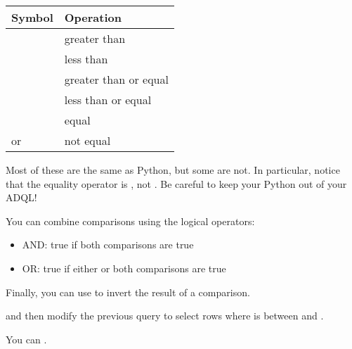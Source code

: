 \documentclass[letterpaper,10pt,english]{sphinxmanual}
\begin{document}
\begin{savenotes}\sphinxattablestart
\centering
\begin{tabulary}{\linewidth}[t]{|T|T|}
\hline
\sphinxstyletheadfamily 
Symbol
&\sphinxstyletheadfamily 
Operation
\\
\hline
\sphinxcode{\sphinxupquote{\textgreater{}}}
&
greater than
\\
\hline
\sphinxcode{\sphinxupquote{\textless{}}}
&
less than
\\
\hline
\sphinxcode{\sphinxupquote{\textgreater{}=}}
&
greater than or equal
\\
\hline
\sphinxcode{\sphinxupquote{\textless{}=}}
&
less than or equal
\\
\hline
\sphinxcode{\sphinxupquote{=}}
&
equal
\\
\hline
\sphinxcode{\sphinxupquote{!=}} or \sphinxcode{\sphinxupquote{\textless{}\textgreater{}}}
&
not equal
\\
\hline
\end{tabulary}
\par
\sphinxattableend\end{savenotes}

Most of these are the same as Python, but some are not.  In particular, notice that the equality operator is \sphinxcode{\sphinxupquote{=}}, not \sphinxcode{\sphinxupquote{==}}.
Be careful to keep your Python out of your ADQL!

You can combine comparisons using the logical operators:
\begin{itemize}
\item {} 
AND: true if both comparisons are true

\item {} 
OR: true if either or both comparisons are true

\end{itemize}

Finally, you can use  to invert the result of a comparison.

  and then modify the previous query to select rows where  is between  and .

You can .
\end{document}
